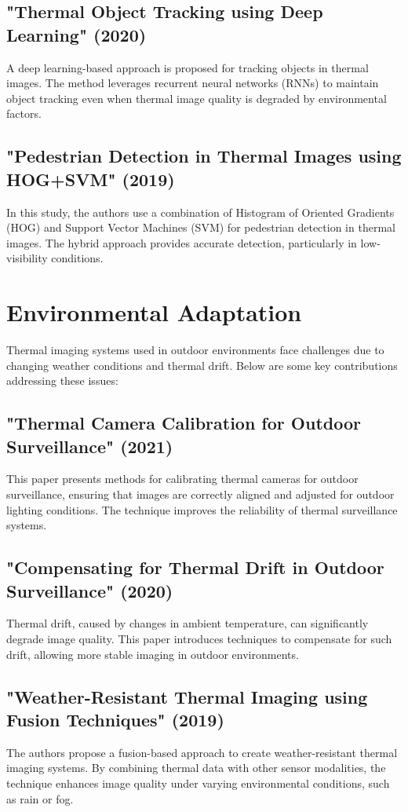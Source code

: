 \documentclass[11pt,a4paper]{report}
\begin{document}
\subsection{"Thermal Object Tracking using Deep Learning" (2020)}
A deep learning-based approach is proposed for tracking objects in thermal images. The method leverages recurrent neural networks (RNNs) to maintain object tracking even when thermal image quality is degraded by environmental factors.

\subsection{"Pedestrian Detection in Thermal Images using HOG+SVM" (2019)}
In this study, the authors use a combination of Histogram of Oriented Gradients (HOG) and Support Vector Machines (SVM) for pedestrian detection in thermal images. The hybrid approach provides accurate detection, particularly in low-visibility conditions.

\section{Environmental Adaptation}

Thermal imaging systems used in outdoor environments face challenges due to changing weather conditions and thermal drift. Below are some key contributions addressing these issues:

\subsection{"Thermal Camera Calibration for Outdoor Surveillance" (2021)}
This paper presents methods for calibrating thermal cameras for outdoor surveillance, ensuring that images are correctly aligned and adjusted for outdoor lighting conditions. The technique improves the reliability of thermal surveillance systems.

\subsection{"Compensating for Thermal Drift in Outdoor Surveillance" (2020)}
Thermal drift, caused by changes in ambient temperature, can significantly degrade image quality. This paper introduces techniques to compensate for such drift, allowing more stable imaging in outdoor environments.

\subsection{"Weather-Resistant Thermal Imaging using Fusion Techniques" (2019)}
The authors propose a fusion-based approach to create weather-resistant thermal imaging systems. By combining thermal data with other sensor modalities, the technique enhances image quality under varying environmental conditions, such as rain or fog.
\end{document}
